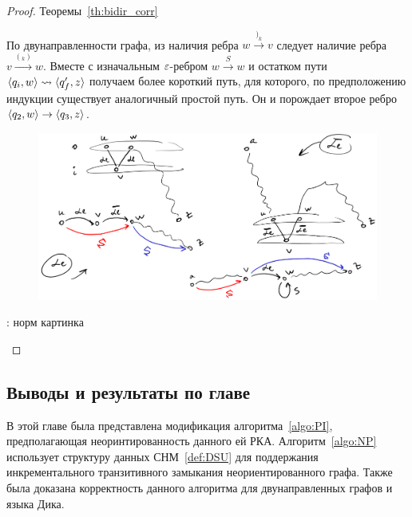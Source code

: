 \begin{proof}{Теоремы~\ref{th:bidir_corr}}
\begin{itemize}
      По двунаправленности графа, из наличия ребра $w \xrightarrow{)_k} v$ следует наличие ребра $v \xrightarrow{(_k)} w$. Вместе с изначальным $\varepsilon$-ребром $w \xrightarrow{S} w$ и остатком пути $\langle q_i, w \rangle \rightsquigarrow \langle q_f', z \rangle$ получаем более короткий путь, для которого, по предположению индукции существует аналогичный простой путь. Он и порождает второе ребро $\langle q_2, w \rangle \rightarrow \langle q_3, z \rangle$. 

    \begin{figure}[H]
        \includegraphics[width=\linewidth]{img/th_proof_img}
    \end{figure}

    \TODO: норм картинка
  \end{itemize}

\end{proof}

\subsection{Выводы и результаты {}по главе}

В этой главе была представлена модификация алгоритма~\ref{algo:PI}, предполагающая неоринтированность данного ей РКА. Алгоритм~\ref{algo:NP} использует структуру данных СНМ~\ref{def:DSU} для поддержания инкрементального транзитивного замыкания неориентированного графа. Также была доказана корректность данного алгоритма для двунаправленных графов и языка Дика.

